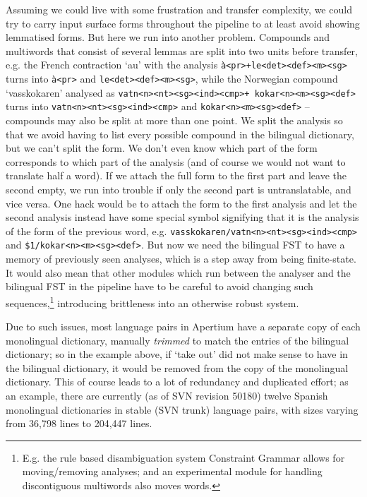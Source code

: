 \documentclass[10pt, a4paper]{article}
\newcommand{\ana}[1]{\texttt{#1}}
\newcommand{\f}[1]{`#1'}
\begin{document}
Assuming we could live with some frustration and transfer complexity,
we could try to carry input surface forms throughout the pipeline to
at least avoid showing lemmatised forms. But here we run into another
problem. Compounds and multiwords that consist of several lemmas are
split into two units before transfer, e.g. the French contraction
\f{au} with the analysis \ana{à<pr>+le<det><def><m><sg>} turns into
\ana{à<pr>} and \ana{le<det><def><m><sg>}, while the Norwegian
compound \f{vasskokaren} analysed as \ana{vatn<n><nt><sg><ind><cmp>+
  kokar<n><m><sg><def>} turns into \ana{vatn<n><nt><sg><ind><cmp>} and
\ana{kokar<n><m><sg><def>} – compounds may also be split at more than
one point. We split the analysis so that we avoid having to list every
possible compound in the bilingual dictionary, but we can't split the
form. We don't even know which part of the form corresponds to which
part of the analysis (and of course we would not want to translate
half a word). If we attach the full form to the first part and leave
the second empty, we run into trouble if only the second part is
untranslatable, and vice versa. One hack would be to attach the form
to the first analysis and let the second analysis instead have some
special symbol signifying that it is the analysis of the form of the
previous word, e.g. \ana{vasskokaren/vatn<n><nt><sg><ind><cmp>} and
\ana{\$1/kokar<n><m><sg><def>}. But now we need the bilingual FST to
have a memory of previously seen analyses, which is a step away from
being finite-state. It would also mean that other modules which run
between the analyser and the bilingual FST in the pipeline have to be
careful to avoid changing such sequences,\footnote{E.g. the rule based
  disambiguation system Constraint Grammar allows for moving/removing
  analyses; and an experimental module for handling discontiguous
  multiwords also moves words.} introducing brittleness into an
otherwise robust system.

Due to such issues, most language pairs in Apertium have a separate
copy of each monolingual dictionary, manually \emph{trimmed} to match
the entries of the bilingual dictionary; so in the example above, if
\f{take out} did not make sense to have in the bilingual dictionary,
it would be removed from the copy of the monolingual dictionary. This
of course leads to a lot of redundancy and duplicated effort; as an
example, there are currently (as of SVN revision 50180) twelve Spanish
monolingual dictionaries in stable (SVN trunk) language pairs, with
sizes varying from 36,798 lines to 204,447 lines.
\end{document}
